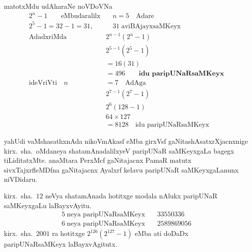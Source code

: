 matotxMdu udAharaNe noVDoVNa
\begin{align*}
2^{n}-1 \qquad\text{eMbudaralilx}& \quad n=5 \quad\text{Adare}\\
2^{5}-1 = 32-1 = 31, &\quad 31\; \text{aviBAjayxsaMKeyx}\\
\text{AdadxriMda}\quad &2^{n-1}(2^{n}-1)\\
&2^{5-1}(2^{5}-1)\\
&= 16(31)\\ 
&= 496 \qquad\textbf{idu paripUNaRsaMKeyx}\\[0.1cm]  %
\text{ideVriVti}\quad n&=7 \quad\text{AdAga}\\
&2^{7-1}(2^{7}-1)\\
&2^{6}(128-1)\\
&64\times 127\\
&=8128 \quad\text{idu paripUNaRsaMKeyx}
\end{align*}

yahUdi vaMshasathxnAda nikoVmAkasf eMba girxVsf gaNitashAsatxrXjacnxnige kirx.~sha.\ oMda\-neya shatamAnadalilxyeV paripUNaR saMKeyxgaLa bagegx tiLiditatxMte. anaMtara PerxMcf gaNitajacnx  PamaR matutx sivxTajxrfleMDfna gaNitajacnx Ayalxrf kelavu paripUNaR saMKeyxgaLanunx niVDidaru. 

kirx.~sha.\ $12$ neVya shatamAnada hotitxge modala nAlukx paripUNaR saMKeyxgaLu laBayxvAyitu.
\begin{align*}
5\;\text{neya paripUNaRsaMKeyx} \quad &33550336\\
6\;\text{neya paripUNaRsaMKeyx} \quad &2589869056
\end{align*}
kirx.~sha.\ $2001$ ra hotitxge $2^{126}(2^{127}-1)$ eMba ati doDaDx paripUNaRsaMKeyx laBayxvAgitutx.
